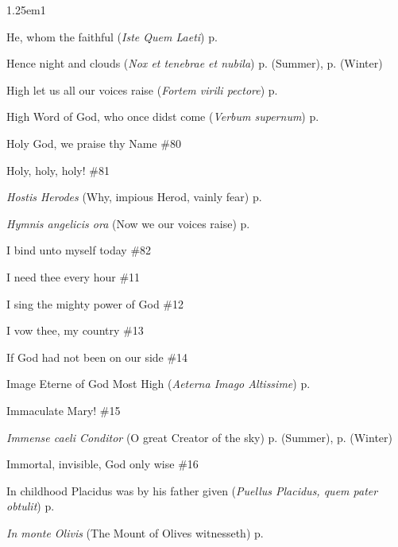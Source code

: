 \begin{hangparas}{1.25em}{1}
\par\noindent
He, whom the faithful (\textit{Iste Quem Laeti}) \dotfill p. \pageref{JosephMattins}
\par\noindent
Hence night and clouds (\textit{Nox et tenebrae et nubila}) \dotfill p. \pageref{WednesdayMattinsSummer} (Summer), p. \pageref{WednesdayMattinsWinter} (Winter)
\par\noindent
High let us all our voices raise (\textit{Fortem virili pectore}) \dotfill p. \pageref{MartyressNotVirginMattins}
\par\noindent
High Word of God, who once didst come (\textit{Verbum supernum}) \dotfill p. \pageref{FirstAdventInvitatory}
\par\noindent
Holy God, we praise thy Name \dotfill \#80
\par\noindent
Holy, holy, holy!  \dotfill \#81
\par\noindent
\textit{Hostis Herodes} (Why, impious Herod, vainly fear) \dotfill p. \pageref{EpiphanyEvensongHymn}
\par\noindent
\textit{Hymnis angelicis ora} (Now we our voices raise) \dotfill p. \pageref{ScholasticaInvitatory}
\par\noindent
I bind unto myself today \dotfill \#82
\par\noindent
I need thee every hour \dotfill \#11
\par\noindent
I sing the mighty power of God \dotfill \#12
\par\noindent
I vow thee, my country \dotfill \#13
\par\noindent
If God had not been on our side \dotfill \#14
\par\noindent
Image Eterne of God Most High (\textit{Aeterna Imago Altissime}) \dotfill p. \pageref{ChristTheKingInvitatory}
\par\noindent
Immaculate Mary! \dotfill \#15
\par\noindent
\textit{Immense caeli Conditor} (O great Creator of the sky) \dotfill p. \pageref{MondayEvensongSummer} (Summer), p. \pageref{MondayEvensongWinter} (Winter)
\par\noindent
Immortal, invisible, God only wise \dotfill \#16
\par\noindent
In childhood Placidus was by his father given (\textit{Puellus Placidus, quem pater obtulit}) \dotfill p. \pageref{MaurusInvitatory}
\par\noindent
\textit{In monte Olivis} (The Mount of Olives witnesseth) \dotfill p. \pageref{HolyRosaryInvitatory}
\par\noindent

\end{hangparas}
